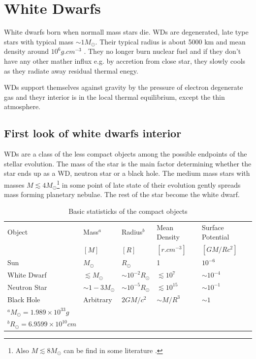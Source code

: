 \documentclass[oneside,a4paper,11pt]{report}
\begin{document}
\chapter{White Dwarfs}
White dwarfs born when normall mass stars die. WDs are degenerated, late type stars with typical mass $\sim 1 M_{\odot}$. Their typical radius is about
 5000 km and mean density around $10^6 g.cm^{-3}$ \citet{2004bhwd.book.....S}. They no longer burn nuclear fuel and
if they don't have any other mather influx e.g. by accretion from close star, they slowly cools as they radiate
away residual thermal enegy.

WDs support themselves against gravity by the pressure of electron degenerate gas and theyr interior is in the local thermal 
equilibrium, except the thin atmosphere.  

\section{First look of white dwarfs interior}
WDs are a class of the less compact objects among the possible endpoints of the stellar evolution. 
The mass of the star is the main factor determining whether the star ends up as a WD, neutron star or a black hole.
The medium mass stars with masses $M \lesssim  4M_{\odot}$\footnote{Also $M \lesssim  8M_{\odot}$ can be find in 
some literature \citet{padm_vII}.} in some point of late state of their evolution gently spreads mass
 forming planetary nebulae. The rest of the star become the white dwarf.  

\begin{table}[hbt!]
\caption{Basic statisticks of the compact objects \citet{2004bhwd.book.....S}}
\centering
\begin{tabular}{lllll}
\hline
\hline
Object & Mass$^a$ & Radius$^b$ & Mean Density & Surface Potential  \\
       & $[M]$ & $[R]$ & $[r.cm^{-3}]$& $[GM/Rc^2]$                    \\
\hline
Sun         & $M_{\odot}$            & $R_{\odot}$             &1                  &$10^{-6}$ \\
White Dwarf & $\lesssim M_{\odot}$   & $\sim 10^{-2}R_{\odot}$ & $\lesssim 10^7$   &$\sim 10^{-4}$ \\
Neutron Star& $\sim1-3M_{\odot}$     & $\sim 10^{-5}R_{\odot}$ & $\lesssim 10^{15}$& $\sim 10^{-1}$\\
Black Hole  & Arbitrary              & $2GM/c^2$               & $\sim M/R^3$      & $\sim1$\\
\hline
\footnotesize
$^a M_{\odot}=1.989 \times 10^{33} g$ &&&& \\
\footnotesize
$^b R_{\odot}=6.9599 \times 10^{10} cm$ &&&& \\
\end{tabular}
\label{comobj1}
\end{table}
\end{document}
